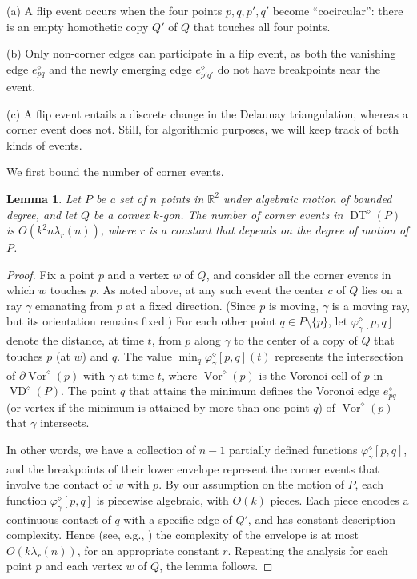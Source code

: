 \documentclass[letter,11pt]{article}
\newtheorem{lemma}[theorem]{Lemma}
\def \reals{{\mathbb R}}
\def\bd{{\partial}}
\def\poly{\diamond}
\def\distfn{\varphi}
\def\DT{\mathop{\mathrm{DT}}}
\def\VD{\mathop{\mathrm{VD}}}
\def\Vor{\mathop{\mathrm{Vor}}}
\begin{document}
\smallskip
\noindent(a) A flip event
occurs when the four points $p,q,p',q'$ become ``cocircular'':
there is an empty homothetic copy $Q'$ of $Q$ that touches all four points.

\smallskip
\noindent(b) Only non-corner edges can participate in a flip event, as
both the vanishing edge $e_{pq}^\poly$ and the newly emerging edge
$e_{p'q'}^\poly$ do not have breakpoints near the event.

\smallskip
\noindent(c) A flip event entails a discrete change in the
Delaunay triangulation, whereas a corner event does not.
Still, for algorithmic purposes, we will keep track of both kinds of events.

\smallskip
We first bound the number of corner events.

\begin{lemma} \label{corners}
Let $P$ be a set of $n$ points in $\reals^2$ under algebraic
motion of bounded degree, and let $Q$ be a convex $k$-gon. 
The number of corner events in $\DT^\poly(P)$ is $O(k^2n\lambda_r(n))$, 
where $r$ is a constant that depends on the degree of motion
of $P$.
\end{lemma}

\begin{proof}
Fix a point $p$ and a vertex $w$ of $Q$, and consider all the corner
events in which $w$ touches $p$. As noted above, at any such event the
center $c$ of $Q$ lies on a ray $\gamma$ emanating from $p$ at a fixed
direction. (Since $p$ is moving, $\gamma$ is a moving ray, but its orientation remains fixed.) For each other point $q\in P\setminus\{p\}$, let $\distfn_\gamma^\poly[p,q]$
denote the distance, at time $t$, from $p$ along $\gamma$ to the center
of a copy of $Q$ that touches $p$ (at $w$) and $q$.
The value
$\min_q \distfn_\gamma^\poly[p,q](t)$ represents the intersection of
$\bd \Vor^\poly(p)$ with $\gamma$ at time $t$, where $\Vor^\poly(p)$ is the Voronoi cell of $p$ in $\VD^\poly(P)$. The point $q$ that attains the
minimum defines the Voronoi edge $e_{pq}^\poly$ (or vertex if the 
minimum is attained by more than one point $q$) of $\Vor^\poly(p)$ that $\gamma$ intersects.

In other words, we have a collection of $n-1$ partially defined
functions $\distfn_\gamma^\poly[p,q]$, and the breakpoints of their lower envelope
represent the corner events that involve the contact
of $w$ with $p$. By our assumption on the motion of $P$, each 
function $\distfn_\gamma^\poly[p,q]$ is piecewise algebraic, 
with $O(k)$ pieces. Each piece encodes a continuous contact of $q$ 
with a specific edge of $Q'$, and has constant description complexity. Hence (see, e.g., \cite[Corollary 1.6]{SA95}) the complexity of
the envelope is at most $O(k\lambda_r(n))$, for an appropriate constant
$r$. Repeating the analysis for each point $p$ and each vertex $w$ of $Q$, the lemma
follows.
\end{proof}
\end{document}
